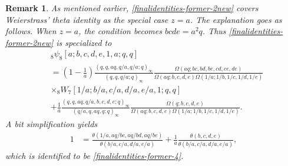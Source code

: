 \documentclass[xits,review,sort&compress]{elsarticle}
\newtheorem{remark}[dl]{Remark}
\numberwithin{equation}{section}
\begin{document}
\begin{remark}
As mentioned earlier,  \eqref{finalidentities-former-2new} covers Weierstrass' theta identity as the special case $z=a$.  The explanation goes as follows.
When $z=a$, the condition becomes $bcde=a^2q$. Thus \eqref{finalidentities-former-2new} is specialized  to
 \begin{align*}
 &{}_{8} \psi_{8}\left[a; b, c, d, e, 1, a ; q, q\right] \nonumber\\
 &=\left(1-\frac{1}{a}\right)\frac{(q,q,aq, q /a,q/a; q)_{\infty}}{\left(q, q,q/a;q\right)_{\infty}}\frac{\Omega(aq;bc,bd,be,cd,ce,de)}{\Omega(aq;b,c,d,e)\Omega(1/a;1/b,1/c,1/d,
 1/e)}\nonumber\\
  &\times{}_{8}W_{7}[1/a ; b/a, c/a, d/a, e/a, 1; q, q]\\
 &+\frac{1}{a}\frac{(q,q,aq, q / a,b, c, d, e; q)_{\infty}}{(q/a,q,aq,q; q)_{\infty}}
 \frac{\Omega(q;b,c,d,e)}{\Omega(aq; b,  c, d,  e)
 \Omega(1/a;1/b,1/c,1/d,1/e)}. \nonumber
\end{align*}
A bit simplification yields
\begin{align*}
1 &=\frac{\theta(1/a,aq/bc,aq/bd,aq/be)}{\theta(b/a,c/a,d/a,e/a)}+ \frac{1}{a}\frac{\theta(b, c, d, e)}{
 \theta(b/a,  c/a, d/a,  e/a)},
\end{align*}
which is identified to be  \eqref{finalidentities-former-4}.
\end{remark}
\end{document}
